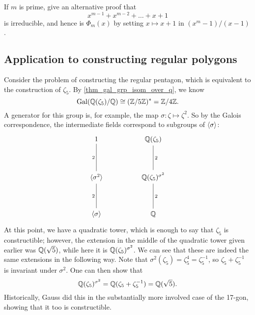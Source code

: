 \begin{exercise}
    If $m$ is prime, give an alternative proof that
    \[
        x^{m - 1} + x^{m - 2} + \ldots + x + 1
    \]
    is irreducible, and hence is $\Phi_m(x)$ by setting $x \mapsto x + 1$ in $(x^m - 1)/(x - 1)$.
\end{exercise}

\subsection{Application to constructing regular polygons}

Consider the problem of constructing the regular pentagon, which is equivalent to the construction of $\zeta_5$. By \cref{thm_gal_grp_isom_over_q}, we know
\[
    \operatorname{Gal}(\mathbb{{Q}}(\zeta_5)/\mathbb{{Q}}) \cong (\mathbb{{Z}}/{{5}}\mathbb{{Z}})^* = \mathbb{{Z}}/{{4}}\mathbb{{Z}}.
\]
A generator for this group is, for example, the map $\sigma: \zeta \mapsto \zeta^2$. So by the Galois correspondence, the intermediate fields correspond to subgroups of $\langle {\sigma} \rangle$:
\[
    \begin{tikzcd}
    	1 && {\mathbb{Q}(\zeta_5)} \\
    	\\
    	{\langle \sigma^2 \rangle} && {\mathbb{Q}(\zeta_5)^{\sigma^2}} \\
    	\\
    	{\langle \sigma \rangle} && {\mathbb{Q}}
    	\arrow["2"', no head, from=1-1, to=3-1]
    	\arrow["2"', no head, from=3-1, to=5-1]
    	\arrow["2", no head, from=1-3, to=3-3]
    	\arrow["2", no head, from=3-3, to=5-3]
    \end{tikzcd}
\]
At this point, we have a quadratic tower, which is enough to say that $\zeta_5$ is constructible; however, the extension in the middle of the quadratic tower given earlier was $\mathbb{{Q}}(\sqrt{5})$, while here it is $\mathbb{{Q}}(\zeta_5)^{\sigma^2}$. We can see that these are indeed the same extensions in the following way. Note that $\sigma^2(\zeta_5) = \zeta_5^{4} = \zeta_5^{-1}$, so $\zeta_5 + \zeta_5^{-1}$ is invariant under $\sigma^2$. One can then show that
\[
    \mathbb{{Q}}(\zeta_5)^{\sigma^2} = \mathbb{{Q}}(\zeta_5 + \zeta_5^{-1}) = \mathbb{{Q}}(\sqrt{5}).
\]
Historically, Gauss did this in the substantially more involved case of the 17-gon, showing that it too is constructible.
